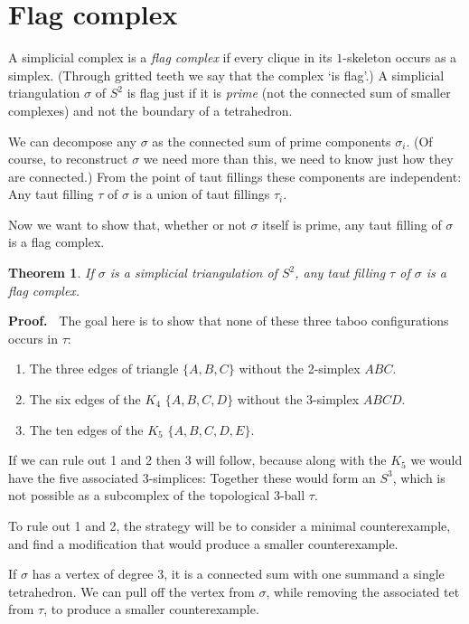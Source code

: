 \documentclass[12pt]{article}
\newtheorem{theorem}{Theorem}
\newcommand{\proofstart}{{\noindent \bf Proof.\ }}
\begin{document}
\section{Flag complex}

A simplicial complex is a \emph{flag complex}
if every clique in
its $1$-skeleton occurs as a simplex.
(Through gritted teeth we say that the complex `is flag'.)
A simplicial triangulation $\sigma$ of $S^2$
is flag just if it is \emph{prime} 
(not the connected sum of smaller complexes)
and not the boundary of a tetrahedron.

We can decompose any $\sigma$ as the connected sum of
prime components $\sigma_i$.
(Of course, to reconstruct $\sigma$ we need more than this, we need to know
just how they are connected.)
From the point of taut fillings these components are independent:
Any taut filling $\tau$ of $\sigma$ is a union of taut fillings $\tau_i$.

Now we want to show that, whether or not $\sigma$ itself is prime, 
any taut filling of $\sigma$ is a flag complex.

\begin{theorem}
If $\sigma$ is a simplicial triangulation of $S^2$,
any taut filling $\tau$ of $\sigma$
is a flag complex.
\end{theorem}

\proofstart
The goal here is to show that none of these
three taboo configurations occurs
in $\tau$:
\begin{enumerate}
\item
The three edges of triangle $\{A,B,C\}$ without the 2-simplex $ABC$.
\item
The six edges of the $K_4$ $\{A,B,C,D\}$ without the 3-simplex $ABCD$.
\item
The ten edges of the $K_5$ $\{A,B,C,D,E\}$.
\end{enumerate}

If we can rule out 1 and 2 then 3 will follow, because
along with the $K_5$ we would have the five associated 3-simplices:
Together these would form an $S^3$, which is not possible as a subcomplex
of the topological 3-ball $\tau$.

To rule out 1 and 2,
the strategy will be to consider a minimal counterexample,
and find a modification that would produce a smaller counterexample.

If $\sigma$ has a vertex of degree 3,
it is a connected sum with one summand a single tetrahedron.
We can pull off the vertex from $\sigma$, while removing the associated
tet from $\tau$, to produce a smaller counterexample.
\end{document}
